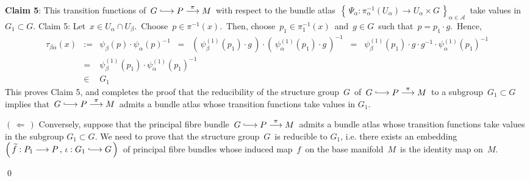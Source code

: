 \vskip 0.5cm
\noindent
\textbf{Claim 5}:\quad
This transition functions of
\,$G \longhookrightarrow P \overset{\pi}{\longrightarrow} M$\,
with respect to the bundle atlas
\,$\left\{\,\Psi_{\alpha} : \pi_{\alpha}^{-1}(U_{\alpha}) \longrightarrow U_{\alpha} \times G\,\right\}_{\alpha\in\mathcal{A}}$\,
take values in \,$G_{1} \subset G$.
\vskip 0.2cm
\proofof Claim 5:\quad
Let \,$x \in U_{\alpha} \cap U_{\beta}$.\,
Choose \,$p \in \pi^{-1}(x)$.\,
Then, choose \,$p_{1} \in \pi_{1}^{-1}(x)$\, and \,$g \in G$\, such that \,$p = p_{1} \cdot g$.\,
Hence,
\begin{eqnarray*}
\tau_{\beta\alpha}(x)
& := &
	\psi_{\beta}(p) \cdot \psi_{\alpha}(p)^{-1}
\;\; = \;\;
	\left(\,\psi_{\beta}^{(1)}(p_{1}) \cdot g\,\right) \cdot \left(\,\psi_{\alpha}^{(1)}(p_{1}) \cdot g\,\right)^{-1}	
\;\; = \;\;
	\psi_{\beta}^{(1)}(p_{1}) \cdot g \cdot g^{-1} \cdot \psi_{\alpha}^{(1)}(p_{1})^{-1}	
\\
& = &
	\psi_{\beta}^{(1)}(p_{1}) \cdot \psi_{\alpha}^{(1)}(p_{1})^{-1}	
\\
& \in &
	G_{1}
\end{eqnarray*}
This proves Claim 5, and completes the proof that
the reducibility of the structure group \,$G$\, of
\,$G \longhookrightarrow P \overset{\pi}{\longrightarrow} M$\,
to a subgroup \,$G_{1} \subset G$\, implies that
\,$G \longhookrightarrow P \overset{\pi}{\longrightarrow} M$\,
admits a bundle atlas whose transition functions take values in $G_{1}$.

\vskip 1.0cm
\noindent
\underline{$(\,\Longleftarrow\,)$}\;\;
Conversely, suppose that the principal fibre bundle
\,$G \longhookrightarrow P \overset{\pi}{\longrightarrow} M$\,
admits a bundle atlas whose transition functions take values in the subgroup $G_{1} \subset G$.
We need to prove that the structure group \,$G$\, is reducible to $G_{1}$, i.e. there exists an embedding
\,$\left(\,\widetilde{f} : P_{1} \longrightarrow P \,,\, \iota : G_{1} \longhookrightarrow G\,\right)$\,
of principal fibre bundles
whose induced map \,$f$\, on the base manifold \,$M$\, is the identity map on \,$M$.\,

\qed


